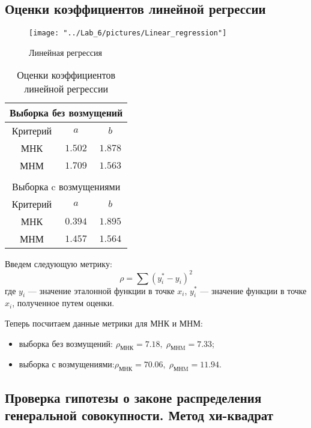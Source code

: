 \documentclass[12pt,a4paper]{article}
\begin{document}
	\subsection{Оценки коэффициентов линейной регрессии}
	\begin{center}
		\begin{figure}[H]
			\texttt{[image: "../Lab\_6/pictures/Linear\_regression"]} 
			\caption[Линейная регрессия]{Линейная регрессия}
		\end{figure}
	
		\begin{table}[H]
			\begin{center}
				\begin{tabular}{|c|c|c|}
					\multicolumn{3}{c}{Выборка без возмущений} \\
					\hline
					Критерий & $a$ & $b$\\
					\hline
					МНК & $1.502$ & $1.878$\\
					\hline
					МНМ & $1.709$ & $1.563$\\
					\hline
					\multicolumn{3}{c}{ } \\
					\multicolumn{3}{c}{Выборка c возмущениями} \\
					\hline
					Критерий & $a$ & $b$\\
					\hline
					МНК & $0.394$ & $1.895$\\
					\hline
					МНМ & $1.457$ & $1.564$\\
					\hline					
				\end{tabular}
				\caption{Оценки коэффициентов линейной регрессии}
			\end{center}
		\end{table}
	\end{center}
	
	Введем следующую метрику: $$\rho=\sum(y^*_i-y_i)^2$$
	где $y_i$ --- значение эталонной функции в точке $x_i$, $y^*_i$ --- значение функции в точке $x_i$, полученное путем оценки.
	
	Теперь посчитаем данные метрики для МНК и МНМ:
	\begin{itemize}
		\item  выборка без возмущений: $\rho_\text{МНК} = 7.18,\; \rho_\text{МНM} = 7.33$;
		
		\item  выборка с возмущениями:$\rho_\text{МНК} = 70.06,\; \rho_\text{МНM} = 11.94$.
	\end{itemize}
	
	\subsection{Проверка гипотезы о законе распределения генеральной совокупности. Метод хи-квадрат}
\end{document}
